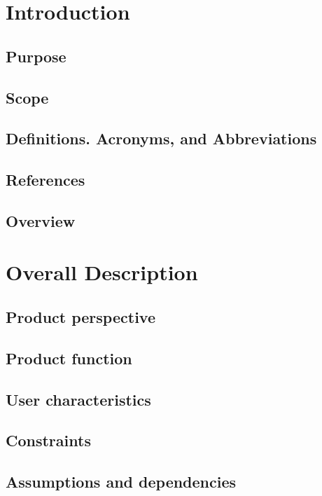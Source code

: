 \documentclass[12pt]{article}
\begin{document}
\newpage
\tableofcontents

\section{Introduction}
   
\subsection{Purpose}
\subsection{Scope}
\subsection{Definitions. Acronyms, and Abbreviations}
\subsection{References}
\subsection{Overview}

\section{Overall Description}
\subsection{Product perspective}
\subsection{Product function}
\subsection{User characteristics}
\subsection{Constraints}
\subsection{Assumptions and dependencies}

\newpage
\end{document}
